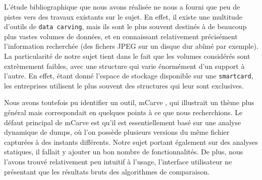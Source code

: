 L'étude bibliographique que nous avons réalisée ne nous a fourni que peu de pistes vers des travaux existants sur le sujet. En effet, il existe une multitude d'outils de \texttt{data carving}, mais ils sont le plus souvent destinés à de beaucoup plus vastes volumes de données, et en connaissant relativement précisément l'information recherchée (des fichers JPEG sur un disque dur abîmé par exemple). La particularité de notre sujet tient dans le fait que les volumes considérés sont extrèmement faibles, avec une structure qui varie énormément d'un support à l'autre. En effet, étant donné l'espace de stockage disponible sur une \texttt{smartcard}, les entreprises utilisent le plus souvent des structures qui leur sont exclusives.

Nous avons toutefois pu identifier un outil, mCarve \cite{mCarve}, qui illustrait un thème plus général mais correspondait en quelques points à ce que nous recherchions. Le défaut principal de mCarve est qu'il est essentiellement basé sur une analyse dynamique de dumps, où l'on possède plusieurs versions du même fichier capturées à des instants différents. Notre sujet portant également sur des analyses statiques, il fallait y ajouter un bon nombre de fonctionnalités. De plus, nous l'avons trouvé relativement peu intuitif à l'usage, l'interface utilisateur ne présentant que les résultats bruts des algorithmes de comparaison.
